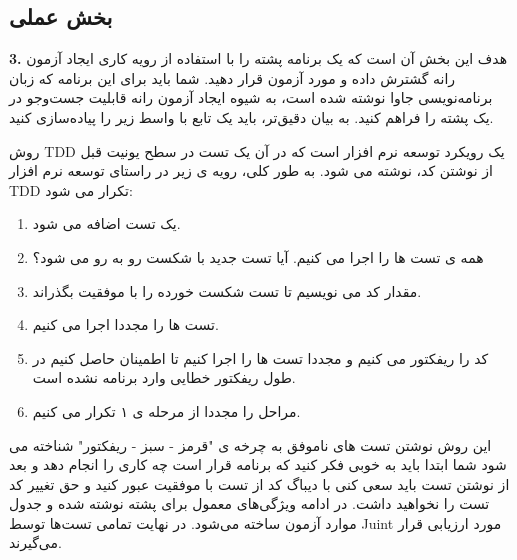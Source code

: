 \documentclass[twoside]{article}
\newenvironment{answer}{}{\medskip}
\newenvironment{question}[1]{\textbf{#1.} }{}
\begin{document}
\subsection*{بخش عملی}
\begin{question}{3}
هدف این بخش آن است که یک برنامه پشته را با استفاده از رویه کاری ایجاد آزمون رانه گشترش داده و مورد آزمون قرار دهید. شما باید برای این برنامه که زبان برنامه‌نویسی جاوا نوشته شده است، به شیوه ایجاد آزمون رانه قابلیت جست‌و‌جو در یک پشته را فراهم کنید. به بیان دقیق‌تر، باید یک تابع با واسط زیر را پیاده‌سازی کنید.

\end{question}
\begin{answer}
روش TDD یک رویکرد توسعه نرم افزار است که در آن یک تست در سطح یونیت قبل از نوشتن کد، نوشته می شود. به طور کلی، رویه ی زیر در راستای توسعه نرم افزار TDD تکرار می شود:
\begin{enumerate}
	\item
یک تست اضافه می شود.
	\item
همه ی تست ها را اجرا می کنیم. آیا تست جدید با شکست رو به رو می شود؟
	\item
مقدار کد می نویسیم تا تست شکست خورده را با موفقیت بگذراند.
	\item
تست ها را مجددا اجرا می کنیم.
	\item
کد را ریفکتور می کنیم و مجددا تست ها را اجرا کنیم تا اطمینان حاصل کنیم در طول ریفکتور خطایی وارد برنامه نشده است.
	\item
مراحل را مجددا از مرحله ی ۱ تکرار می کنیم.
\end{enumerate}
این روش نوشتن تست های ناموفق به چرخه ی "قرمز - سبز - ریفکتور" شناخته می شود شما ابتدا باید به خوبی فکر کنید که برنامه قرار است چه کاری را انجام دهد و بعد از نوشتن تست باید سعی کنی با دیباگ کد از تست با موفقیت عبور کنید و حق تغییر کد تست را نخواهید داشت. در ادامه ویژگی‌های معمول برای پشته نوشته شده و جدول موارد آزمون ساخته می‌شود. در نهایت تمامی تست‌ها توسط Juint مورد ارزیابی قرار می‌گیرند.


\end{answer}
\end{document}
